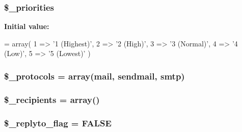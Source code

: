 \subsubsection[{\$\+\_\+priorities}]{\setlength{\rightskip}{0pt plus 5cm}\$\+\_\+priorities\hspace{0.3cm}{\ttfamily [protected]}}\label{class_c_i___email_af2e56ba04b214aad41be6db88e729645}
{\bfseries Initial value\+:}
\begin{DoxyCode}
= array(
        1 => \textcolor{stringliteral}{'1 (Highest)'},
        2 => \textcolor{stringliteral}{'2 (High)'},
        3 => \textcolor{stringliteral}{'3 (Normal)'},
        4 => \textcolor{stringliteral}{'4 (Low)'},
        5 => \textcolor{stringliteral}{'5 (Lowest)'}
    )
\end{DoxyCode}
\hypertarget{class_c_i___email_a67dcd847790518bf5fbe6576a0c11c04}{}
\subsubsection[{\$\+\_\+protocols}]{\setlength{\rightskip}{0pt plus 5cm}\$\+\_\+protocols = array(\textquotesingle{}mail\textquotesingle{}, \textquotesingle{}sendmail\textquotesingle{}, \textquotesingle{}smtp\textquotesingle{})\hspace{0.3cm}{\ttfamily [protected]}}\label{class_c_i___email_a67dcd847790518bf5fbe6576a0c11c04}
\hypertarget{class_c_i___email_aa5f5e78dd9477bdec18b4aadae77ba13}{}
\subsubsection[{\$\+\_\+recipients}]{\setlength{\rightskip}{0pt plus 5cm}\$\+\_\+recipients = array()\hspace{0.3cm}{\ttfamily [protected]}}\label{class_c_i___email_aa5f5e78dd9477bdec18b4aadae77ba13}
\hypertarget{class_c_i___email_a00e8e2c2c72e6acf2cd91a8c4498695a}{}
\subsubsection[{\$\+\_\+replyto\+\_\+flag}]{\setlength{\rightskip}{0pt plus 5cm}\$\+\_\+replyto\+\_\+flag = F\+A\+L\+S\+E\hspace{0.3cm}{\ttfamily [protected]}}\label{class_c_i___email_a00e8e2c2c72e6acf2cd91a8c4498695a}
\hypertarget{class_c_i___email_a9f2bbbf11ed324c1744f64d81242e8d5}{}
